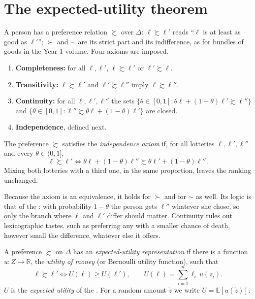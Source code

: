 \section{The expected-utility theorem}\label{sec:b2:expected-utility:theorem}

A person has a preference relation $\succsim$ over $\Delta$: $\ell \succsim \ell'$ reads ``$\ell$ is
at least as good as $\ell'$''; $\succ$ and $\sim$ are its strict part and its indifference, as for
bundles of goods in the Year 1 volume. Four axioms are imposed.

\begin{enumerate}
  \item \textbf{Completeness:} for all $\ell, \ell'$, $\ell \succsim \ell'$ or $\ell' \succsim \ell$.
  \item \textbf{Transitivity:} $\ell \succsim \ell'$ and $\ell' \succsim \ell''$ imply $\ell \succsim
        \ell''$.
  \item \textbf{Continuity:} for all $\ell, \ell', \ell''$ the sets $\{\theta \in [0,1] : \theta\ell +
        (1-\theta)\ell' \succsim \ell''\}$ and $\{\theta \in [0,1] : \ell'' \succsim \theta\ell +
        (1-\theta)\ell'\}$ are closed.
  \item \textbf{Independence}, defined next.
\end{enumerate}

\begin{definition}\label{def:b2:expected-utility:independence-axiom}
The preference $\succsim$ satisfies the \emph{independence axiom} if, for
all lotteries $\ell, \ell', \ell''$ and every $\theta \in (0, 1]$,
\[
\ell \succsim \ell' \iff \theta\ell + (1-\theta)\ell'' \succsim \theta\ell' + (1-\theta)\ell'' .
\]
Mixing both lotteries with a third one, in the same proportion, leaves the ranking unchanged.
\end{definition}

Because the axiom is an equivalence, it holds for $\succ$ and for $\sim$ as well. Its logic is that of
the : with probability $1-\theta$ the person gets $\ell''$ whatever she chose, so only
the branch where $\ell$ and $\ell'$ differ should matter. Continuity rules out lexicographic tastes, such
as preferring any  with a smaller chance of death, however small the difference, whatever else
it offers.

\begin{definition}\label{def:b2:expected-utility:eu-representation}
A preference $\succsim$ on $\Delta$ has an \emph{expected-utility
representation} if there is a function $u : Z \to \mathbb{R}$,
the \emph{utility of money} (or Bernoulli utility function), such that
\[
\ell \succsim \ell' \iff U(\ell) \ge U(\ell'), \qquad U(\ell) = \sum_{i=1}^{n} \ell_i\,u(z_i) .
\]
$U$ is the \emph{expected utility} of the . For a random amount $\tilde z$ we write $U =
\mathbb{E}[u(\tilde z)]$.
\end{definition}

